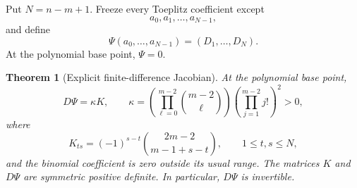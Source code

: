 \documentclass{amsart}
\numberwithin{equation}{section}
\newtheorem{theorem}{Theorem}
\theoremstyle{definition}
\theoremstyle{remark}
\begin{document}
Put $N=n-m+1$.  Freeze every Toeplitz coefficient except
\[
 a_0,a_1,\ldots,a_{N-1},
\]
and define
\begin{equation}\label{eq:Psi}
 \Psi(a_0,\ldots,a_{N-1})=(D_1,\ldots,D_N).
\end{equation}
At the polynomial base point, $\Psi=0$.

\begin{theorem}[Explicit finite-difference Jacobian]\label{thm:explicit-jacobian}
At the polynomial base point,
\begin{equation}\label{eq:explicit-jacobian}
 D\Psi=\kappa K,
 \qquad
 \kappa=
 \left(\prod_{\ell=0}^{m-2}\binom{m-2}{\ell}\right)
 \left(\prod_{j=1}^{m-2}j!\right)^2>0,
\end{equation}
where
\begin{equation}\label{eq:K}
 K_{ts}=(-1)^{s-t}\binom{2m-2}{m-1+s-t},
 \qquad 1\le t,s\le N,
\end{equation}
and the binomial coefficient is zero outside its usual range.  The matrices $K$ and $D\Psi$ are symmetric positive definite.  In particular, $D\Psi$ is invertible.
\end{theorem}
\end{document}
